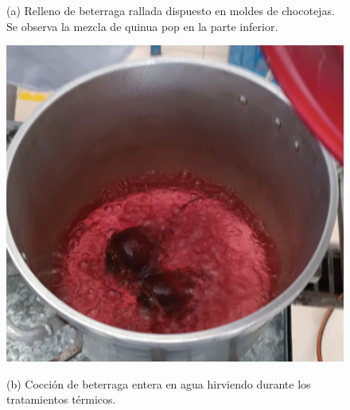 \documentclass[manuscript,screen,review]{acmart}
\begin{document}
\begin{figure}[H]
\begin{minipage}{0.48\linewidth}
            
            \small (a) Relleno de beterraga rallada dispuesto en moldes de chocotejas. Se observa la mezcla de quinua pop en la parte inferior.
          \end{minipage}
          \hspace{1em}
          \begin{minipage}{0.48\linewidth}
            \centering
            \includegraphics[width=0.9\linewidth]{imagen/coc-beterraga.jpeg}
            
            
            \small (b) Cocción de beterraga entera en agua hirviendo durante los tratamientos térmicos.
          \end{minipage}
          
          \vspace{1ex}
          

\end{figure}
\end{document}
